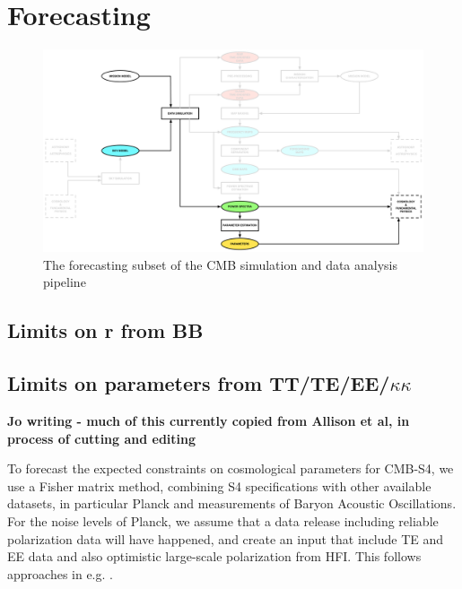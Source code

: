 
\section{Forecasting}


\begin{figure}[htbp]
\centering
\includegraphics[width=1\textwidth]{Analysis/fc}
\caption{The forecasting subset of the CMB simulation and data analysis pipeline}
\label{default}
\end{figure}


\subsection{Limits on r from BB}


\subsection{Limits on parameters from TT/TE/EE/$\kappa\kappa$}

{\bf Jo writing - much of this currently copied from Allison et al, in process of cutting and editing}

To forecast the expected constraints on cosmological parameters for CMB-S4, we use a Fisher matrix method, combining S4 specifications with other available datasets, in particular Planck and measurements of Baryon Acoustic Oscillations. For the noise levels of Planck, we assume that a data release including reliable polarization data will have happened, and create an input that include TE and EE data and also optimistic large-scale polarization from HFI. This follows approaches in e.g. \cite{allison/etal:2015}.

